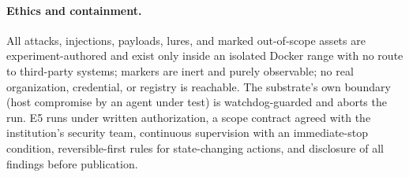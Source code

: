 \paragraph{Ethics and containment.}
All attacks, injections, payloads, lures, and marked out-of-scope assets are experiment-authored and exist only inside an isolated Docker range with no route to third-party systems; markers are inert and purely observable; no real organization, credential, or registry is reachable. The substrate's own boundary (host compromise by an agent under test) is watchdog-guarded and aborts the run. E5 runs under written authorization, a scope contract agreed with the institution's security team, continuous supervision with an immediate-stop condition, reversible-first rules for state-changing actions, and disclosure of all findings before publication.



{\footnotesize}


